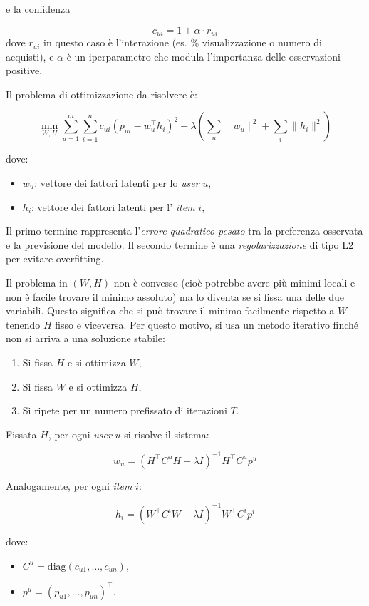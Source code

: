 e la confidenza
    
\[
c_{ui} = 1 + \alpha \cdot r_{ui}
\]
dove $r_{ui}$ in questo caso è l'interazione (es. \% visualizzazione o numero di acquisti), e $\alpha$ è un iperparametro che modula l'importanza delle osservazioni positive.

Il problema di ottimizzazione da risolvere è:

\[
\min_{W, H} \sum_{u=1}^m \sum_{i=1}^n c_{ui} (p_{ui} - w_u^\top h_i)^2 + \lambda \left( \sum_u \|w_u\|^2 + \sum_i \|h_i\|^2 \right)
\]

dove:

\begin{itemize}
    \item $w_u$: vettore dei fattori latenti per lo \textit{user} $u$,
    \item $h_i$: vettore dei fattori latenti per l' \textit{item} $i$,
\end{itemize}

Il primo termine rappresenta l'\textit{errore quadratico pesato} tra la preferenza osservata e la previsione del modello. Il secondo termine è una \textit{regolarizzazione} di tipo L2 per evitare overfitting.

Il problema in $(W,H)$ non è convesso (cioè potrebbe avere più minimi locali e non è facile trovare il minimo assoluto) ma lo diventa se si fissa una delle due variabili. Questo significa che si può trovare il minimo facilmente rispetto a $W$ tenendo $H$ fisso e viceversa. Per questo motivo, si usa un metodo iterativo finché non si arriva a una soluzione stabile:

\begin{enumerate}
    \item Si fissa $H$ e si ottimizza $W$,
    \item Si fissa $W$ e si ottimizza $H$,
    \item Si ripete per un numero prefissato di iterazioni $T$.
\end{enumerate}

Fissata $H$, per ogni \textit{user} $u$ si risolve il sistema:

\[
w_u = \left( H^\top C^u H + \lambda I \right)^{-1} H^\top C^u p^u
\]

Analogamente, per ogni \textit{item} $i$:

\[
h_i = \left( W^\top C^i W + \lambda I \right)^{-1} W^\top C^i p^i
\]

dove:

\begin{itemize}
    \item $C^u = \text{diag}(c_{u1}, \dots, c_{un})$,
    \item $p^u = (p_{u1}, \dots, p_{un})^\top$.
\end{itemize}

